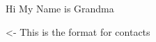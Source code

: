 \documentclass[char]{LRSguildcamp1}
\begin{document}
\name{\cGrandma{}}
Hi My Name is Grandma

\begin{itemz}[Goals]
	\item 
\end{itemz}

\begin{itemz}[Notes]
	\item 
\end{itemz}

\begin{contacts}
	\contact{\cArchitect{}} <- This is the format for contacts 
\end{contacts}
\end{document}
